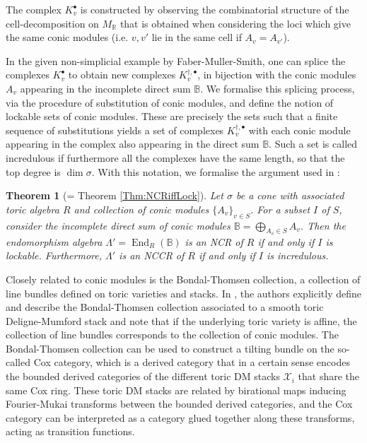\documentclass[reqno, 12pt]{amsart}
\newtheorem{theorem}{Theorem}[section]
\theoremstyle{definition}
\numberwithin{equation}{section}
\newcommand{\newterm}{\textsf}
\newcommand{\R}{\mathbb{R}}
\newcommand{\End}{\operatorname{End}}
\begin{document}
The complex $K_v^\bullet$ is constructed by observing the combinatorial structure of the cell-decomposition on $M_\R$ that is obtained when considering the loci which give the same conic modules (i.e. $v,v'$ lie in the same cell if $A_v=A_{v'}$).

In the given non-simplicial example by Faber-Muller-Smith, one can splice the complexes $K_v^\bullet$ to obtain new complexes $K_v^{\dagger,\bullet}$, in bijection with the conic modules $A_v$ appearing in the incomplete direct sum $\mathbb{B}$. We formalise this splicing process, via the procedure of \newterm{substitution} of conic modules, and define the notion of \newterm{lockable} sets of conic modules. These are precisely the sets such that a finite sequence of substitutions yields a set of complexes $K_v^{\dagger,\bullet}$ with each conic module appearing in the complex also appearing in the direct sum $\mathbb{B}$. Such a set is called \newterm{incredulous} if furthermore all the complexes have the same length, so that the top degree is $\dim \sigma$. With this notation, we formalise the argument used in \cite{FMS19}:
\begin{theorem}[= Theorem \ref{Thm:NCRiffLock}]
    Let $\sigma$ be a cone with associated toric algebra $R$ and collection of conic modules $\{A_v\}_{v\in S}$. For a subset $I$ of $S$, consider the incomplete direct sum of conic modules $\mathbb{B}=\bigoplus_{A_v\in S}A_v$. Then the endomorphism algebra $\Lambda'=\End_R(\mathbb{B})$ is an NCR of $R$ if and only if $I$ is lockable. Furthermore, $\Lambda'$ is an NCCR of $R$ if and only if $I$ is incredulous.
\end{theorem}

Closely related to conic modules is the Bondal-Thomsen collection, a collection of line bundles defined on toric varieties and stacks. In \cite{BBB+}, the authors explicitly define and describe the Bondal-Thomsen collection associated to a smooth toric Deligne-Mumford stack and note that if the underlying toric variety is affine, the collection of line bundles corresponds to the collection of conic modules. 
The Bondal-Thomsen collection can be used to construct a tilting bundle on the so-called \newterm{Cox category}, which is a derived category that in a certain sense encodes the bounded derived categories of the different toric DM stacks $\mathcal{X}_i$ that share the same Cox ring. These toric DM stacks are related by birational maps inducing Fourier-Mukai transforms between the bounded derived categories, and the Cox category can be interpreted as a category glued together along these transforms, acting as transition functions.
\end{document}
